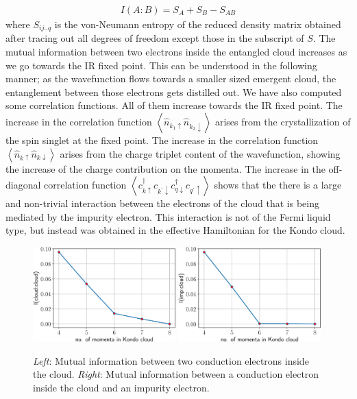 \documentclass[12pt,twoside]{report}
\numberwithin{equation}{section}
\begin{document}
\begin{equation}\begin{aligned}
	I(A: B) = S_A + S_B - S_{AB}
\end{aligned}\end{equation}
where \(S_{ij..q}\) is the von-Neumann entropy of the reduced density matrix obtained after tracing out all degrees of freedom except those in the subscript of \(S\).
\pb The mutual information between two electrons inside the entangled cloud increases as we go towards the IR fixed point. This can be understood in the following manner; as the wavefunction flows towards a smaller sized emergent cloud, the entanglement between those electrons gets distilled out.
\pb We have also computed some correlation functions. All of them increase towards the IR fixed point. The increase in the correlation function \(\left<\hat n_{k_1 \uparrow} \hat n_{k_2 \downarrow} \right>\) arises from the crystallization of the spin singlet at the fixed point. The increase in the correlation function \(\left<\hat n_{k \uparrow} \hat n_{k \downarrow} \right>\) arises from the charge triplet content of the wavefunction, showing the increase of the charge contribution on the momenta. The increase in the off-diagonal correlation function \(\left< c^\dagger_{k \uparrow}c_{k^\prime \downarrow}c^\dagger_{q \downarrow}c_{q^\prime \uparrow}\right>\) shows that the there is a large and non-trivial interaction between the electrons of the cloud that is being mediated by the impurity electron. This interaction is not of the Fermi liquid type, but instead was obtained in the effective Hamiltonian for the Kondo cloud.
\begin{figure}[htpb!]
	\centering
	\includegraphics[width=0.49\textwidth]{../figures/mutI_ee.pdf}
	\includegraphics[width=0.49\textwidth]{../figures/mutI_d_e.pdf}
	\caption{\textit{Left}: Mutual information between two conduction electrons inside the cloud. \textit{Right}: Mutual information between a conduction electron inside the cloud and an impurity electron.}
	\label{mutI}
\end{figure}
\end{document}
